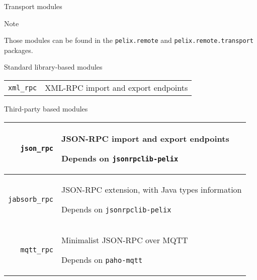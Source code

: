 \begin{frame}{Transport modules}

\begin{exampleblock}{Note}
\begin{small}
Those modules can be found in the \texttt{pelix.remote} and \texttt{pelix.remote.transport} packages.
\end{small}
\end{exampleblock}

\begin{block}{Standard library-based modules}
\begin{small}
\begin{tabular}{rp{}}
\texttt{xml\_rpc} & XML-RPC import and export endpoints \\
\end{tabular}
\end{small}
\end{block}

\begin{block}{Third-party based modules}
\begin{small}
\begin{tabular}{rp{}}
\texttt{json\_rpc} & JSON-RPC import and export endpoints \par Depends on \texttt{jsonrpclib-pelix} \\
\hline
\texttt{jabsorb\_rpc} & JSON-RPC extension, with Java types information \par Depends on \texttt{jsonrpclib-pelix} \\
\hline
\texttt{mqtt\_rpc} & Minimalist JSON-RPC over MQTT \par Depends on \texttt{paho-mqtt} \\
\end{tabular}
\end{small}
\end{block}
\end{frame}
